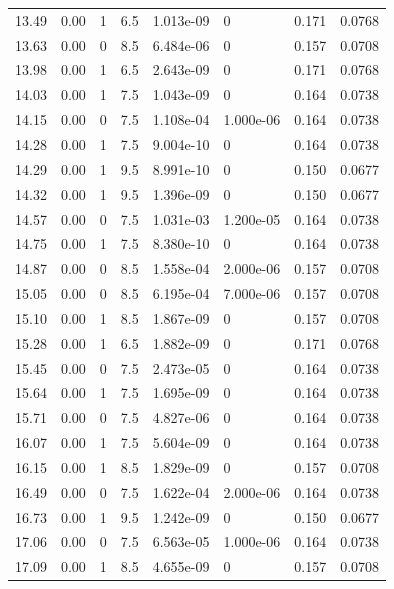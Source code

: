 \documentclass[preview]{standalone}
\begin{document}
{{{\begin{tabular}{L{1.2cm}C{1.2cm} C{0.3cm}C{0.5cm} C{1.4cm}C{1.4cm} C{1.4cm}C{1.4cm}}
  13.49  &  0.00  & 1     & 6.5 &  1.013e-09  & 0  & 0.171 &  0.0768   \\ 
  13.63  &  0.00  & 0     & 8.5 &  6.484e-06  & 0  & 0.157 &  0.0708   \\ 
  13.98  &  0.00  & 1     & 6.5 &  2.643e-09  & 0  & 0.171 &  0.0768   \\ 
  14.03  &  0.00  & 1     & 7.5 &  1.043e-09  & 0  & 0.164 &  0.0738   \\ 
  14.15  &  0.00  & 0     & 7.5 &  1.108e-04  & 1.000e-06  & 0.164 &  0.0738   \\ 
  14.28  &  0.00  & 1     & 7.5 &  9.004e-10  & 0  & 0.164 &  0.0738   \\ 
  14.29  &  0.00  & 1     & 9.5 &  8.991e-10  & 0  & 0.150 &  0.0677   \\ 
  14.32  &  0.00  & 1     & 9.5 &  1.396e-09  & 0  & 0.150 &  0.0677   \\ 
  14.57  &  0.00  & 0     & 7.5 &  1.031e-03  & 1.200e-05  & 0.164 &  0.0738   \\ 
  14.75  &  0.00  & 1     & 7.5 &  8.380e-10  & 0  & 0.164 &  0.0738   \\ 
  14.87  &  0.00  & 0     & 8.5 &  1.558e-04  & 2.000e-06  & 0.157 &  0.0708   \\ 
  15.05  &  0.00  & 0     & 8.5 &  6.195e-04  & 7.000e-06  & 0.157 &  0.0708   \\ 
  15.10  &  0.00  & 1     & 8.5 &  1.867e-09  & 0  & 0.157 &  0.0708   \\ 
  15.28  &  0.00  & 1     & 6.5 &  1.882e-09  & 0  & 0.171 &  0.0768   \\ 
  15.45  &  0.00  & 0     & 7.5 &  2.473e-05  & 0  & 0.164 &  0.0738   \\ 
  15.64  &  0.00  & 1     & 7.5 &  1.695e-09  & 0  & 0.164 &  0.0738   \\ 
  15.71  &  0.00  & 0     & 7.5 &  4.827e-06  & 0  & 0.164 &  0.0738   \\ 
  16.07  &  0.00  & 1     & 7.5 &  5.604e-09  & 0  & 0.164 &  0.0738   \\ 
  16.15  &  0.00  & 1     & 8.5 &  1.829e-09  & 0  & 0.157 &  0.0708   \\ 
  16.49  &  0.00  & 0     & 7.5 &  1.622e-04  & 2.000e-06  & 0.164 &  0.0738   \\ 
  16.73  &  0.00  & 1     & 9.5 &  1.242e-09  & 0  & 0.150 &  0.0677   \\ 
  17.06  &  0.00  & 0     & 7.5 &  6.563e-05  & 1.000e-06  & 0.164 &  0.0738   \\ 
  17.09  &  0.00  & 1     & 8.5 &  4.655e-09  & 0  & 0.157 &  0.0708   \\ 

\end{tabular}}}}
\end{document}
